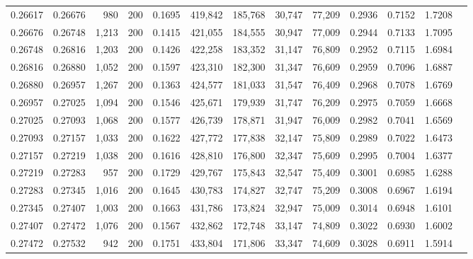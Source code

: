 \begin{tabular}{rrrrrrrrrrrrr}
0.26617 & 0.26676 &    980 & 200 &                                     0.1695 & 419,842 & 185,768 &  30,747 &  77,209 & 0.2936 & 0.7152 & 1.7208 \\
0.26676 & 0.26748 &  1,213 & 200 &                                     0.1415 & 421,055 & 184,555 &  30,947 &  77,009 & 0.2944 & 0.7133 & 1.7095 \\
0.26748 & 0.26816 &  1,203 & 200 &                                     0.1426 & 422,258 & 183,352 &  31,147 &  76,809 & 0.2952 & 0.7115 & 1.6984 \\
0.26816 & 0.26880 &  1,052 & 200 &                                     0.1597 & 423,310 & 182,300 &  31,347 &  76,609 & 0.2959 & 0.7096 & 1.6887 \\
0.26880 & 0.26957 &  1,267 & 200 &                                     0.1363 & 424,577 & 181,033 &  31,547 &  76,409 & 0.2968 & 0.7078 & 1.6769 \\
0.26957 & 0.27025 &  1,094 & 200 &                                     0.1546 & 425,671 & 179,939 &  31,747 &  76,209 & 0.2975 & 0.7059 & 1.6668 \\
0.27025 & 0.27093 &  1,068 & 200 &                                     0.1577 & 426,739 & 178,871 &  31,947 &  76,009 & 0.2982 & 0.7041 & 1.6569 \\
0.27093 & 0.27157 &  1,033 & 200 &                                     0.1622 & 427,772 & 177,838 &  32,147 &  75,809 & 0.2989 & 0.7022 & 1.6473 \\
0.27157 & 0.27219 &  1,038 & 200 &                                     0.1616 & 428,810 & 176,800 &  32,347 &  75,609 & 0.2995 & 0.7004 & 1.6377 \\
0.27219 & 0.27283 &    957 & 200 &                                     0.1729 & 429,767 & 175,843 &  32,547 &  75,409 & 0.3001 & 0.6985 & 1.6288 \\
0.27283 & 0.27345 &  1,016 & 200 &                                     0.1645 & 430,783 & 174,827 &  32,747 &  75,209 & 0.3008 & 0.6967 & 1.6194 \\
0.27345 & 0.27407 &  1,003 & 200 &                                     0.1663 & 431,786 & 173,824 &  32,947 &  75,009 & 0.3014 & 0.6948 & 1.6101 \\
0.27407 & 0.27472 &  1,076 & 200 &                                     0.1567 & 432,862 & 172,748 &  33,147 &  74,809 & 0.3022 & 0.6930 & 1.6002 \\
0.27472 & 0.27532 &    942 & 200 &                                     0.1751 & 433,804 & 171,806 &  33,347 &  74,609 & 0.3028 & 0.6911 & 1.5914 \\

\end{tabular}
